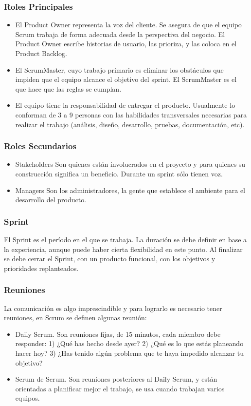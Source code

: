 \documentclass[12pt]{beamer}
\begin{document}
\begin{frame}
 \frametitle{Roles Principales}
 
 \begin{itemize}
  \item<2-> El \alert{Product Owner} representa la voz del cliente. Se asegura de que el equipo Scrum trabaja de forma adecuada desde la perspectiva del negocio. El Product Owner escribe historias de usuario, las prioriza, y las coloca en el Product Backlog.
  \item<3-> El \alert{ScrumMaster}, cuyo trabajo primario es eliminar los obstáculos que impiden que el equipo alcance el objetivo del sprint. El ScrumMaster es el que hace que las reglas se cumplan.
  \item<4-> El \alert{equipo} tiene la responsabilidad de entregar el producto. Usualmente lo conforman de 3 a 9 personas con las habilidades transversales necesarias para realizar el trabajo (análisis, diseño, desarrollo, pruebas, documentación, etc). 
 \end{itemize}
\end{frame}


\begin{frame}
 \frametitle{Roles Secundarios}
 \begin{itemize}
  \item<2-> \alert{Stakeholders} Son quienes están involucrados en el proyecto y para quienes su construcción significa un beneficio. Durante un sprint sólo tienen voz.
  \item<3-> \alert{Managers} Son los administradores, la gente que establece el ambiente para el desarrollo del producto. 
 \end{itemize}

\end{frame}


\begin{frame}
 \frametitle{Sprint}
 El Sprint es el período en el que se trabaja. La duración se debe definir en base a la experiencia, aunque puede haber cierta flexibilidad en este punto. Al finalizar se debe cerrar el Sprint, con un producto funcional, con los objetivos y prioridades replanteados.
\end{frame}


\begin{frame}
 \frametitle{Reuniones}
 La comunicación es algo imprescindible y para lograrlo es necesario tener reuniones, en Scrum se definen algunas reunión:
 \begin{itemize}
  \item<2-> Daily Scrum. Son reuniones fijas, de 15 minutos, cada miembro debe responder: 
  1) ¿Qué has hecho desde ayer? 
  2) ¿Qué es lo que estás planeando hacer hoy? 
  3) ¿Has tenido algún problema que te haya impedido alcanzar tu objetivo?
  \item<3-> Scrum de Scrum. Son reuniones posteriores al Daily Scrum, y están orientadas a planificar mejor el trabajo, se usa cuando trabajan varios equipos.
 \end{itemize}
\end{frame}  
\end{document}
